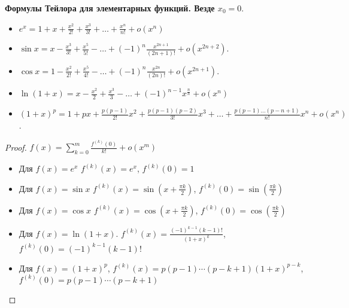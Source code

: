 \textbf{Формулы Тейлора для элементарных функций. Везде $x_0=0$}.
\begin{itemize}
    \item $e^x = 1 + x + \frac{x^2}{2!} + \frac{x^3}{3!} + \ldots + \frac{x^n}{n!} + o(x^n)$
    \item $\sin x = x - \frac{x^3}{3!} + \frac{x^5}{5!} - \ldots + (-1)^n \frac{x^{2n + 1}}{(2n+1)!} + o(x^{2n + 2})$.
    \item $\cos x = 1 - \frac{x^2}{2!} + \frac{x^5}{4!} - \ldots + (-1)^n \frac{x^{2n}}{(2n)!} + o(x^{2n+1})$.
    \item $\ln (1+x) = x - \frac{x^2}{2} + \frac{x^3}{3} - \ldots + (-1)^{n-1} x^\frac{n}{n} + o(x^n)$ 
    \item $(1+x)^p = 1+px + \frac{p(p-1)}{2!}x^2 + \frac{p(p-1)(p-2)}{3!}x^3 + \ldots + \frac{p(p-1)\ldots(p-n+1)}{n!}x^n + o(x^n)$.
\end{itemize}
\begin{proof}
    $f(x) = \sum_{k=0}^{m} \frac{f^{(k)}(0)}{k!} + o(x^m)$
    \begin{itemize}
    \item Для $f(x) = e^x$ $f^{(k)}(x) = e^x$, $f^{(k)}(0) = 1$
    \item Для $f(x) = \sin x$ $f^{(k)}(x) = \sin(x + \frac{\pi k}2)$, $f^{(k)}(0) = \sin(\frac{\pi k}2)$
    \item Для $f(x) = \cos x$ $f^{(k)}(x) = \cos(x + \frac{\pi k}2)$, $f^{(k)}(0) = \cos(\frac{\pi k}2)$
    \item Для $f(x) = \ln(1+x)$.  $f^{(k)}(x) = \frac{(-1)^{k-1}(k-1)!}{(1+x)^k}$, $f^{(k)}(0) = (-1)^{k-1}(k-1)!$
    \item Для $f(x) = (1 + x)^p$, $f^{(k)}(x) = p(p-1)\cdots(p-k+1)(1+x)^{p - k}$, $f^{(k)}(0) = p(p-1)\cdots(p-k+1)$
    \end{itemize}
\end{proof}


